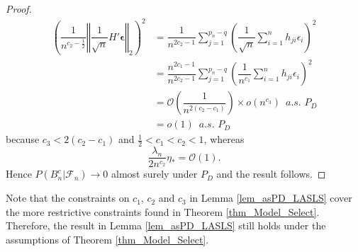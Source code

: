 \documentclass[ejs,authoryear,linksfromyear]{imsart}
\newcommand{\sumin}{\sum_{i=1}^n} %
\numberwithin{equation}{section}
\theoremstyle{plain}
\begin{document}
\begin{proof}
\begin{align*}
	\left( 
		\dfrac{1}{n^{c_2 - \frac{1}{2} }}
		\left\Vert
		\dfrac{1}{\sqrt{n}} H' \bm{\epsilon}
		\right\Vert_2
	\right)^2 
	&= \dfrac{1}{ n^{2 c_2 - 1} } 
	\sum_{j=1}^{p_n-q}
	\left(
		\dfrac{1}{\sqrt{n}}
		\sumin h_{ji} \epsilon_i
	\right)^2 \\
	&= \dfrac{ n^{2 c_1 - 1} }{ n^{2 c_2 - 1} }
	\sum_{j=1}^{p_n-q}
	\left(
		\dfrac{1}{n^{c_1}}
		\sumin h_{ji} \epsilon_i
	\right)^2 \\
	&= \mathcal{O} \left(
		\dfrac{1}{ n^{2(c_2 - c_1)} }
	\right) 
	\times
	o \left( n^{c_3} \right) \,\,\, a.s. \,\, P_D \\
	&= o(1) \,\,\, a.s. \,\, P_D
	\end{align*}
	because $c_3 < 2(c_2 - c_1)$ and $\frac{1}{2} < c_1 < c_2 < 1$, whereas 
	$$
	\frac{\lambda_n}{2 n^{c_2}} \eta_*
	= \mathcal{O}(1).
	$$
	Hence $P \left( B_n^c \big| \mathcal{F}_n \right) \to 0$ almost surely under $P_D$ and the result follows.
\end{proof}

Note that the constraints on $c_1$, $c_2$ and $c_3$ in Lemma \ref{lem_asPD_LASLS} cover the more restrictive constraints found in Theorem \ref{thm_Model_Select}. Therefore, the result in Lemma \ref{lem_asPD_LASLS} still holds under the assumptions of Theorem \ref{thm_Model_Select}.
\end{document}
